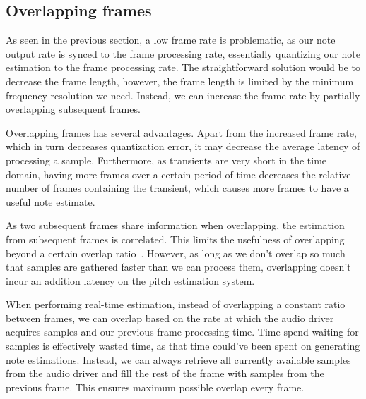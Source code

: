 \documentclass[a4paper,10pt,twocolumn]{article}
\begin{document}
\subsection{Overlapping frames}  \label{sec:overlapping}
As seen in the previous section, a low frame rate is problematic, as our note output rate is synced to the frame processing rate, essentially quantizing our note estimation to the frame processing rate. The straightforward solution would be to decrease the frame length, however, the frame length is limited by the minimum frequency resolution we need. Instead, we can increase the frame rate by partially overlapping subsequent frames.

Overlapping frames has several advantages. Apart from the increased frame rate, which in turn decreases quantization error, it may decrease the average latency of processing a sample. Furthermore, as transients are very short in the time domain, having more frames over a certain period of time decreases the relative number of frames containing the transient, which causes more frames to have a useful note estimate.%

As two subsequent frames share information when overlapping, the estimation from subsequent frames is correlated. This limits the usefulness of overlapping beyond a certain overlap ratio~\cite{overlap}. However, as long as we don't overlap so much that samples are gathered faster than we can process them, overlapping doesn't incur an addition latency on the pitch estimation system.

When performing real-time estimation, instead of overlapping a constant ratio between frames, we can overlap based on the rate at which the audio driver acquires samples and our previous frame processing time. Time spend waiting for samples is effectively wasted time, as that time could've been spent on generating note estimations. Instead, we can always retrieve all currently available samples from the audio driver and fill the rest of the frame with samples from the previous frame. This ensures maximum possible overlap every frame.
\end{document}
